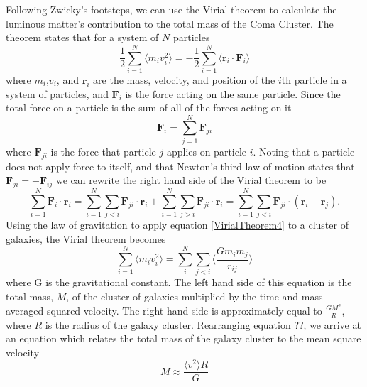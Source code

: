\documentclass[a4paper,12pt]{article}
\begin{document}
Following Zwicky's footsteps, we can use the Virial theorem to calculate the luminous matter's contribution to the total mass of the Coma Cluster.  The theorem states that for a system of $N$ particles
\begin{equation} \label{VirialTheorem}
\frac{1}{2} \sum_{i=1}^{N} \langle m_i v^2_i \rangle = -\frac{1}{2} \sum_{i=1}^N \langle \mathbf{r}_i \cdot {\mathbf{F}_i} \rangle
\end{equation} \label{VirialTheorem2}
where $m_i$,$v_i$, and $\mathbf{r}_i$ are the mass, velocity, and position of the $i$th particle in a system of particles, and $\mathbf{F}_i$ is the force acting on the same particle.  Since the total force on a particle is the sum of all of the forces acting on it
\begin{equation}
\mathbf{F}_i = \sum_{j=1}^N \mathbf{F}_{ji}
\end{equation} \label{VirialTheorem3}
where $\mathbf{F}_{ji}$ is the force that particle $j$ applies on particle $i$.  Noting that a particle does not apply force to itself, and that Newton's third law of motion states that $\mathbf{F}_{ji} = -\mathbf{F}_{ij}$ we can rewrite the right hand side of the Virial theorem to be
\begin{equation} \label{VirialTheorem4}
 \sum_{i=1}^N \mathbf{F}_i \cdot \mathbf{r}_i = \sum_{i=1}^N \sum_{j<i} \mathbf{F}_{ji} \cdot \mathbf{r}_i +  \sum_{i=1}^N \sum_{j>i} \mathbf{F}_{ji} \cdot \mathbf{r}_i = \sum_{i=1}^N \sum_{j<i} \mathbf{F}_{ji} \cdot (\mathbf{r}_i - \mathbf{r}_j).
 \end{equation}
Using the law of gravitation to apply equation \ref{VirialTheorem4} to a cluster of galaxies, the Virial theorem becomes
\begin{equation} \label{VirialTheorem5}
 \sum_{i=1}^{N} \langle m_i v^2_i \rangle = \sum_{i}^{N} \sum_{j<i} \langle  \frac{Gm_im_j}{r_{ij}} \rangle
 \end{equation}
where G is the gravitational constant.  The left hand side of this equation is the total mass, $M$, of the cluster of galaxies multiplied by the time and mass averaged squared velocity.  The right hand side is approximately equal to $\frac{GM^2}{R}$, where $R$ is the radius of the galaxy cluster.  Rearranging equation ??, we arrive at an equation which relates the total mass of the galaxy cluster to the mean square velocity
\begin{equation} \label{VirialTheorem6}
 M \approx \frac{ \langle v^2 \rangle R }{G}
\end{equation} 
\end{document}
